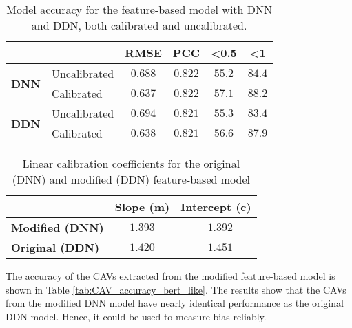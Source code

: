 \begin{table}[H]
    \centering
    \begin{tabular}{|l|l|c|c|c|c|}
        \hline
        \multicolumn{2}{|l|}{\textbf{}} & \textbf{RMSE} & \textbf{PCC} & \textbf{\textless 0.5} & \textbf{\textless 1}          \\ \hline
        \multirow{2}{*}{\textbf{DNN}}
                                        & Uncalibrated  & $0.688$      & $0.822$                & $55.2$               & $84.4$ \\ \cline{2-6}
                                        & Calibrated    & $0.637$      & $0.822$                & $57.1$               & $88.2$ \\ \hline
        \multirow{2}{*}{\textbf{DDN}}
                                        & Uncalibrated  & $0.694$      & $0.821$                & $55.3$               & $83.4$ \\ \cline{2-6}
                                        & Calibrated    & $0.638$      & $0.821$                & $56.6$               & $87.9$ \\ \hline
    \end{tabular}
    \caption{Model accuracy for the feature-based model with DNN and DDN, both calibrated and uncalibrated.}
    \label{tab:model_accuracy_dnn_like}
\end{table}


\begin{table}[H]
    \centering
    \begin{tabular}{|l|c|c|}
        \hline
        \textbf{}               & \textbf{Slope (m)} & \textbf{Intercept (c)} \\ \hline
        \textbf{Modified (DNN)} & $1.393$            & $-1.392$               \\ \hline
        \textbf{Original (DDN)} & $1.420$            & $-1.451$               \\ \hline
    \end{tabular}
    \caption{Linear calibration coefficients for the original (DNN) and modified (DDN) feature-based model}
    \label{tab:linear_regression_coefficients_dnn_like}
\end{table}

The accuracy of the CAVs extracted from the modified feature-based model is shown in Table \ref{tab:CAV_accuracy_bert_like}. The results show that the CAVs from the modified DNN model have nearly identical performance as the original DDN model. Hence, it could be used to measure bias reliably.

